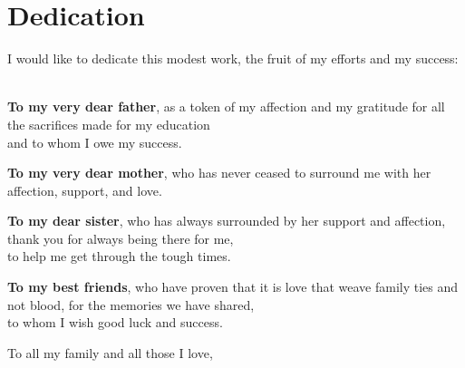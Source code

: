 \chapter*{Dedication}

\thispagestyle{empty}
%
\begin{center}
  I would like to dedicate this modest work, the fruit of my efforts and my success: ~\\
  
\vspace{2\baselineskip}


  \textbf{To my very dear father}, as a token of my affection and my
gratitude for all the sacrifices made for my education ~\\
  and to whom I owe my success. ~\\
  \vspace{2\baselineskip}

  \textbf{To my very dear mother}, who has never ceased to surround me with her ~\\
  affection, support, and love. ~\\
    \vspace{2\baselineskip}

  \textbf{To my dear sister}, who has always
surrounded by her support and affection, thank you for always being there for me, ~\\
  to help me get through the tough times. ~\\
      \vspace{2\baselineskip}

  \textbf{To my best friends}, who have proven that it is love that
weave family ties and not blood, for the memories we have shared, ~\\
   to whom I wish good luck and success. ~\\
         \vspace{2\baselineskip}

To all my family and all those I love, ~\\
  
\end{center}
%
%
%
%
%
%
%
